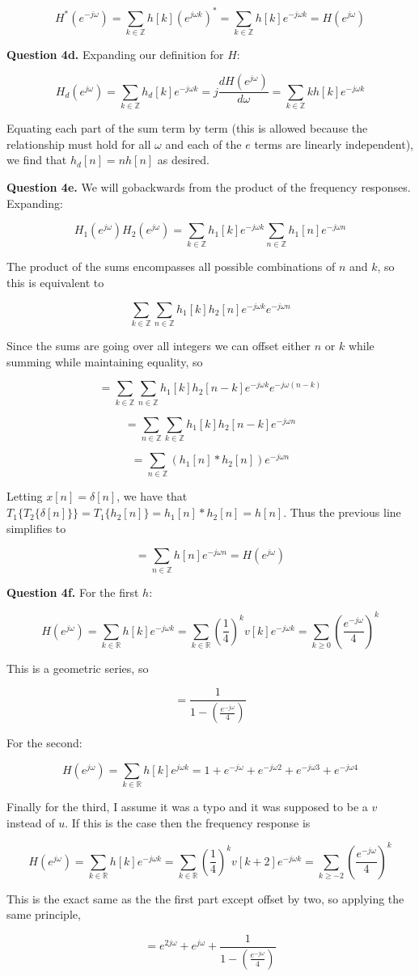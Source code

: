 \documentclass[letterpaper, reqno,11pt]{article}
\newcommand{\RR}{\mathbb{R}}
\newcommand{\ZZ}{\mathbb{Z}}
\begin{document}
$$
    H^*(e^{-j\omega})=\sum_{k\in\ZZ}h[k](e^{j\omega k})^*=\sum_{k\in\ZZ}h[k]e^{-j\omega k}=H(e^{j\omega})
$$

{\noindent\bf Question 4d.} Expanding our definition for $H$: 

$$
    H_d(e^{j\omega})=\sum_{k\in\ZZ}h_d[k]e^{-j\omega k}=j\frac{dH(e^{j\omega})}{d\omega}=\sum_{k\in\ZZ}k h[k]e^{-j\omega k}
$$

Equating each part of the sum term by term (this is allowed because the relationship must hold for all $\omega$ and each of the $e$ terms are linearly independent), we find that $h_d[n]=nh[n]$ as desired. 

{\noindent\bf Question 4e.} We will gobackwards from the product of the frequency responses. Expanding: 

$$
    H_1(e^{j\omega})H_2(e^{j\omega}) = \sum_{k\in\ZZ}h_1[k]e^{-j\omega k}\sum_{n\in\ZZ}h_1[n]e^{-j\omega n}
$$

The product of the sums encompasses all possible combinations of $n$ and $k$, so this is equivalent to 

$$
    \sum_{k\in\ZZ}\sum_{n\in\ZZ}h_1[k]h_2[n]e^{-j\omega k}e^{-j\omega n}
$$

Since the sums are going over all integers we can offset either $n$ or $k$ while summing while maintaining equality, so 

$$
    =\sum_{k\in\ZZ}\sum_{n\in\ZZ}h_1[k]h_2[n-k]e^{-j\omega k}e^{-j\omega (n-k)}
$$

$$
    =\sum_{n\in\ZZ}\sum_{k\in\ZZ}h_1[k]h_2[n-k]e^{-j\omega n}
$$

$$
    =\sum_{n\in\ZZ}(h_1[n]*h_2[n])e^{-j\omega n}
$$

Letting $x[n]=\delta[n]$, we have that $T_1\{T_2\{\delta[n]\}\}=T_1\{h_2[n]\}=h_1[n]*h_2[n]=h[n]$. Thus the previous line simplifies to 

$$
    =\sum_{n\in\ZZ} h[n]e^{-j\omega n}=H(e^{j\omega})
$$

{\noindent\bf Question 4f.} For the first $h$: 

$$
    H(e^{j\omega}) = \sum_{k\in\RR} h[k] e^{-j\omega k}=\sum_{k\in\RR}(\frac14)^k v[k]e^{-j\omega k}=\sum_{k\geq0} (\frac{e^{-j\omega}}{4})^{k}
$$

This is a geometric series, so

$$
    =\frac1{1-(\frac{e^{-j\omega}}4)}
$$

For the second: 

$$
    H(e^{j\omega}) = \sum_{k\in\RR}h[k]e^{j\omega k}=1+e^{-j\omega}+e^{-j\omega 2}+e^{-j\omega 3}+e^{-j\omega 4}
$$

Finally for the third, I assume it was a typo and it was supposed to be a $v$ instead of $u$. If this is the case then the frequency response is 

$$
    H(e^{j\omega}) = \sum_{k\in\RR} h[k] e^{-j\omega k}=\sum_{k\in\RR}(\frac14)^k v[k+2]e^{-j\omega k}=\sum_{k\geq-2} (\frac{e^{-j\omega}}{4})^{k}
$$

This is the exact same as the the first part except offset by two, so applying the same principle, 

$$
    =e^{2j\omega} + e^{j\omega}+\frac1{1-(\frac{e^{-j\omega}}4)}
$$
\end{document}
